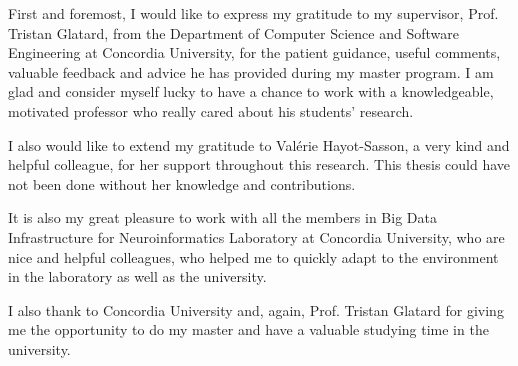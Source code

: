 \begin{acknowledgments}

First and foremost, I would like to express my gratitude to my supervisor, 
Prof. Tristan Glatard, from the Department of Computer Science and 
Software Engineering at Concordia University, for the patient guidance, 
useful comments, valuable feedback and advice he has provided 
during my master program. 
I am glad and consider myself lucky to have a chance to work 
with a knowledgeable, motivated professor who really cared about 
his students' research. 

I also would like to extend my gratitude to Val\'erie Hayot-Sasson, 
a very kind and helpful colleague, for her support throughout this research. 
This thesis could have not been done without her knowledge and contributions. 


It is also my great pleasure to work with all the members in Big Data 
Infrastructure for Neuroinformatics Laboratory at Concordia University, 
who are nice and helpful colleagues, who helped me to quickly adapt to 
the environment in the laboratory as well as the university. 

I also thank to Concordia University and, again, Prof. Tristan Glatard for 
giving me the opportunity to do my master and have a valuable 
studying time in the university.

\end{acknowledgments}